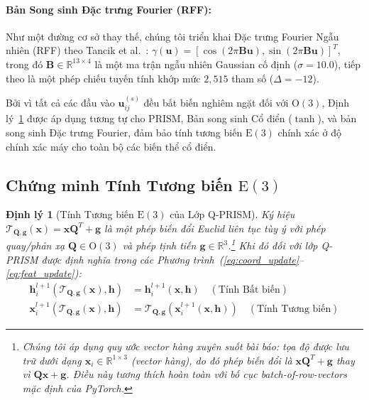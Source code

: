 \documentclass[10pt,twocolumn,letterpaper]{article}
\newtheorem{theorem}{Định lý}
\begin{document}
\paragraph{Bản Song sinh Đặc trưng Fourier (RFF):}
Như một đường cơ sở thay thế, chúng tôi triển khai Đặc trưng Fourier Ngẫu nhiên (RFF) theo Tancik et al.~\cite{tancik2020fourier}:
$\gamma(\mathbf{u}) = [\cos(2\pi \mathbf{B}\mathbf{u}), \sin(2\pi \mathbf{B}\mathbf{u})]^T$, trong đó $\mathbf{B} \in \mathbb{R}^{13 \times 4}$ là một ma trận ngẫu nhiên Gaussian cố định ($\sigma = 10.0$), tiếp theo là một phép chiếu tuyến tính khớp mức $2{,}515$ tham số ($\Delta = -12$).

Bởi vì tất cả các đầu vào $\mathbf{u}_{ij}^{(s)}$ đều bất biến nghiêm ngặt đối với $\mathrm{O}(3)$, Định lý~\ref{thm:equivariance} được áp dụng tương tự cho PRISM, Bản song sinh Cổ điển ($\tanh$), và bản song sinh Đặc trưng Fourier, đảm bảo tính tương biến $\mathrm{E}(3)$ chính xác ở độ chính xác máy cho toàn bộ các biến thể cổ điển.

\subsection{Chứng minh Tính Tương biến $\mathrm{E}(3)$}

\begin{theorem}[Tính Tương biến $\mathrm{E}(3)$ của Lớp Q-PRISM]
\label{thm:equivariance}
Ký hiệu $\mathcal{T}_{\mathbf{Q}, \mathbf{g}}(\mathbf{x}) = \mathbf{x} \mathbf{Q}^T + \mathbf{g}$ là một phép biến đổi Euclid liên tục tùy ý với phép quay/phản xạ $\mathbf{Q} \in \mathrm{O}(3)$ và phép tịnh tiến $\mathbf{g} \in \mathbb{R}^3$.\footnote{Chúng tôi áp dụng quy ước vector hàng xuyên suốt bài báo: tọa độ được lưu trữ dưới dạng $\mathbf{x}_i \in \mathbb{R}^{1 \times 3}$ (vector hàng), do đó phép biến đổi là $\mathbf{x} \mathbf{Q}^T + \mathbf{g}$ thay vì $\mathbf{Q}\mathbf{x} + \mathbf{g}$. Điều này tương thích hoàn toàn với bố cục batch-of-row-vectors mặc định của PyTorch.} Khi đó đối với lớp Q-PRISM được định nghĩa trong các Phương trình~(\ref{eq:coord_update}--\ref{eq:feat_update}):
\begin{align}
    \mathbf{h}_i^{l+1}(\mathcal{T}_{\mathbf{Q}, \mathbf{g}}(\mathbf{x}), \mathbf{h}) &= \mathbf{h}_i^{l+1}(\mathbf{x}, \mathbf{h}) \quad (\text{Tính Bất biến}) \\
    \mathbf{x}_i^{l+1}(\mathcal{T}_{\mathbf{Q}, \mathbf{g}}(\mathbf{x}), \mathbf{h}) &= \mathcal{T}_{\mathbf{Q}, \mathbf{g}}(\mathbf{x}_i^{l+1}(\mathbf{x}, \mathbf{h})) \quad (\text{Tính Tương biến})
\end{align}
\end{theorem}
\end{document}
